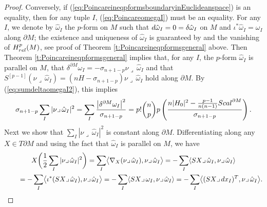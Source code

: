 \documentclass[11pt]{article}
\numberwithin{equation}{section}
\numberwithin{equation}{section}
\begin{document}
\begin{proof}
Conversely, if (\ref{eq:PoincareineqpformsboundaryinEuclideanspace}) is an equality, then for any tuple $I$, (\ref{eq:PoincareomegaI}) must be an equality.
For any $I$, we denote by $\hat{\omega}_I$ the $p$-form on $M$ such that ${\rm d}\hat{\omega}_I=0=\delta\hat{\omega}_I$ on $M$ and $\iota^*\hat{\omega}_I=\omega_I$ along $\partial M$; the existence and uniqueness of $\hat{\omega}_I$ is guaranteed by \cite[Theorem 2]{DuffSpencer52} and the vanishing of  $H_{\rm rel}^p(M)$,  see proof of Theorem \ref{t:Poincareineqpformsgeneral} above. Then Theorem \ref{t:Poincareineqpformsgeneral} implies that, for any $I$, the $p$-form $\hat{\omega}_I$ is parallel on $M$, that $\delta^{\partial M}\omega_I=-\sigma_{n+1-p}\nu\lrcorner\,\hat{\omega}_I$ and that $S^{[p-1]}(\nu\lrcorner\,\hat{\omega}_I)=(nH-\sigma_{n+1-p})\nu\lrcorner\,\hat{\omega}_I$ hold along $\partial M$. By (\ref{eq:sumdeltaomegaI2}), this implies
\begin{gather}\label{eq:sumdeltaomegaI2bis}
\sigma_{n+1-p}\sum_I|\nu\lrcorner\,\hat{\omega}_I|^2=\sum_I\frac{\bigl|\delta^{\partial M}\omega_I\bigr|^2}{\sigma_{n+1-p}}
=p!\binom{n}{p}p\left(\frac{n|H_0|^2-\frac{p-1}{n(n-1)}{\rm Scal}^{\partial M}}{\sigma_{n+1-p}}\right).
\end{gather}
Next we show that $\sum_I|\nu\lrcorner\,\hat{\omega}_I|^2$ is constant along $\partial M$. Differentiating along any $X\in T\partial M$ and using the fact that $\hat{\omega}_I$ is parallel on $M$, we have
\begin{gather*}
X\biggl(\frac{1}{2}\sum_I|\nu\lrcorner\,\hat{\omega}_I|^2\biggr)
=\sum_I\bigl\langle\nabla_X(\nu\lrcorner\,\hat{\omega}_I),\nu\lrcorner\,\hat{\omega}_I\bigr\rangle
=-\sum_I\langle SX\lrcorner\,\hat{\omega}_I,\nu\lrcorner\,\hat{\omega}_I\rangle\\
\qquad{}=-\sum_I\bigl\langle \iota^*(SX\lrcorner\,\hat{\omega}_I),\nu\lrcorner\,\hat{\omega}_I\bigr\rangle
=-\sum_I\langle SX\lrcorner\,\omega_I,\nu\lrcorner\,\hat{\omega}_I\rangle
=-\sum_I\bigl\langle (SX\lrcorner\,{\rm d}x_I)^T,\nu\lrcorner\,\hat{\omega}_I\bigr\rangle.
\end{gather*}


\end{proof}
\end{document}
